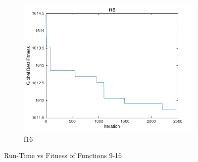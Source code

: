\begin{figure}
\begin{subfigure}[b]{0.4\textwidth}
    \includegraphics[width=\textwidth]{img/cecrt/f16}
    \caption{f16}
  \end{subfigure}
  \caption{Run-Time vs Fitness of Functions 9-16}
\end{figure}

\clearpage

